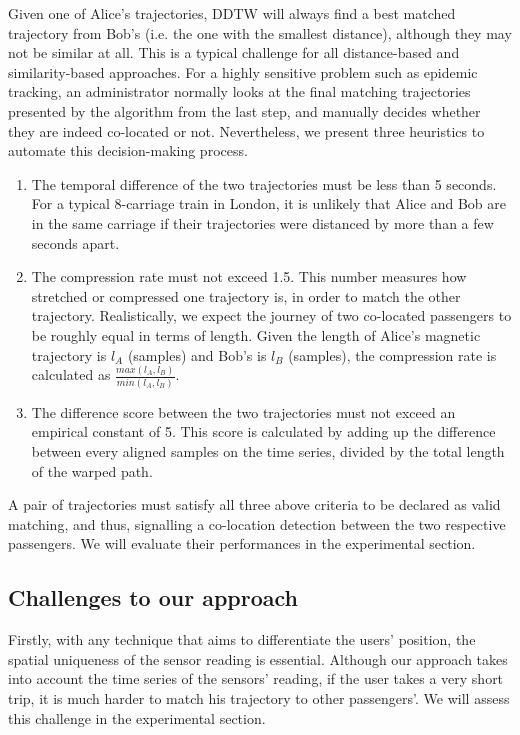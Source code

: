 \documentclass[conference]{IEEEtran}
\begin{document}
Given one of Alice's trajectories, DDTW will always find a best matched trajectory from Bob's (i.e. the one with the smallest distance), although they may not be similar at all. This is a typical challenge for all distance-based and similarity-based approaches. For a highly sensitive problem such as epidemic tracking, an administrator normally looks at the final matching trajectories presented by the algorithm from the last step, and manually decides whether they are indeed co-located or not. Nevertheless, we present three heuristics to automate this decision-making process.
\begin{enumerate}
	\item The temporal difference of the two trajectories must be less than 5 seconds. For a typical 8-carriage train in London, it is unlikely that Alice and Bob are in the same carriage if their trajectories were distanced by more than a few seconds apart.
	\item The compression rate must not exceed 1.5. This number measures how stretched or compressed one trajectory is, in order to match the other trajectory. Realistically, we expect the journey of two co-located passengers to be roughly equal in terms of length. Given the length of Alice's magnetic trajectory is $l_A$ (samples) and Bob's is $l_B$ (samples), the compression rate is calculated as $\frac{max(l_A, l_B)}{min(l_A, l_B)}$.
	\item The difference score between the two trajectories must not exceed an empirical constant of 5. This score is calculated by adding up the difference between every aligned samples on the time series, divided by the total length of the warped path.	
\end{enumerate}

A pair of trajectories must satisfy all three above criteria to be declared as valid matching, and thus, signalling a co-location detection between the two respective passengers. We will evaluate their performances in the experimental section.



\subsection{Challenges to our approach}
Firstly, with any technique that aims to differentiate the users' position, the spatial uniqueness of the sensor reading is essential. Although our approach takes into account the time series of the sensors' reading, if the user takes a very short trip, it is much harder to match his trajectory to other passengers'. We will assess this challenge in the experimental section.
\end{document}
